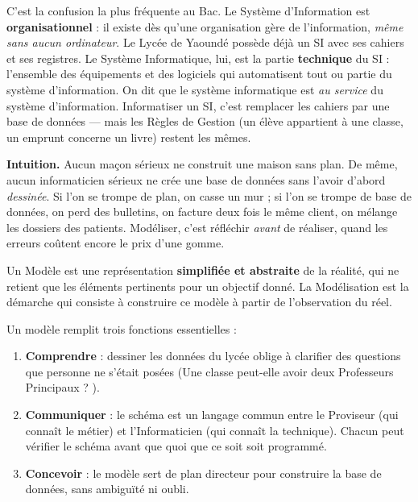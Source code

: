 \documentclass[11pt]{article}
\newcommand{\cle}[1]{{\popxbold\color{popdark}#1}}
\newcounter{popsec}
\newcounter{popsub}
\newcommand{\courssub}[1]{%
  \stepcounter{popsub}%
  \par\vspace{9pt}\noindent{\popxbold\fontsize{11.5}{13}\selectfont\color{popink}{\color{poporange}\thepopsec.\thepopsub}\hspace{6pt}#1}\par\nopagebreak\vspace{4pt}
}
\begin{document}
\begin{attention}
C'est la confusion la plus fréquente au Bac. Le \cle{Système d'Information} est \textbf{organisationnel} : il existe dès qu'une organisation gère de l'information, \emph{même sans aucun ordinateur}. Le Lycée de Yaoundé possède déjà un SI avec ses cahiers et ses registres. Le \cle{Système Informatique}, lui, est la partie \textbf{technique} du SI : l'ensemble des équipements et des logiciels qui automatisent tout ou partie du système d'information. On dit que le système informatique est \emph{au service} du système d'information. Informatiser un SI, c'est remplacer les cahiers par une base de données — mais les \cle{Règles de Gestion} (un élève appartient à une classe, un emprunt concerne un livre) restent les mêmes.
\end{attention}

\courssub{Pourquoi modéliser ?}

\textbf{Intuition.} Aucun maçon sérieux ne construit une maison sans plan. De même, aucun informaticien sérieux ne crée une base de données sans l'avoir d'abord \emph{dessinée}. Si l'on se trompe de plan, on casse un mur ; si l'on se trompe de base de données, on perd des bulletins, on facture deux fois le même client, on mélange les dossiers des patients. Modéliser, c'est réfléchir \emph{avant} de réaliser, quand les erreurs coûtent encore le prix d'une gomme.

\begin{definition}
Un \cle{Modèle} est une représentation \textbf{simplifiée et abstraite} de la réalité, qui ne retient que les éléments pertinents pour un objectif donné. La \cle{Modélisation} est la démarche qui consiste à construire ce modèle à partir de l'observation du réel.
\end{definition}

Un modèle remplit trois fonctions essentielles :

\begin{enumerate}
\item \textbf{Comprendre} : dessiner les données du lycée oblige à clarifier des questions que personne ne s'était posées (\og Une classe peut-elle avoir deux Professeurs Principaux ? \fg{}).
\item \textbf{Communiquer} : le schéma est un langage commun entre le Proviseur (qui connaît le métier) et l'Informaticien (qui connaît la technique). Chacun peut vérifier le schéma avant que quoi que ce soit soit programmé.
\item \textbf{Concevoir} : le modèle sert de plan directeur pour construire la base de données, sans ambiguïté ni oubli.
\end{enumerate}
\end{document}
